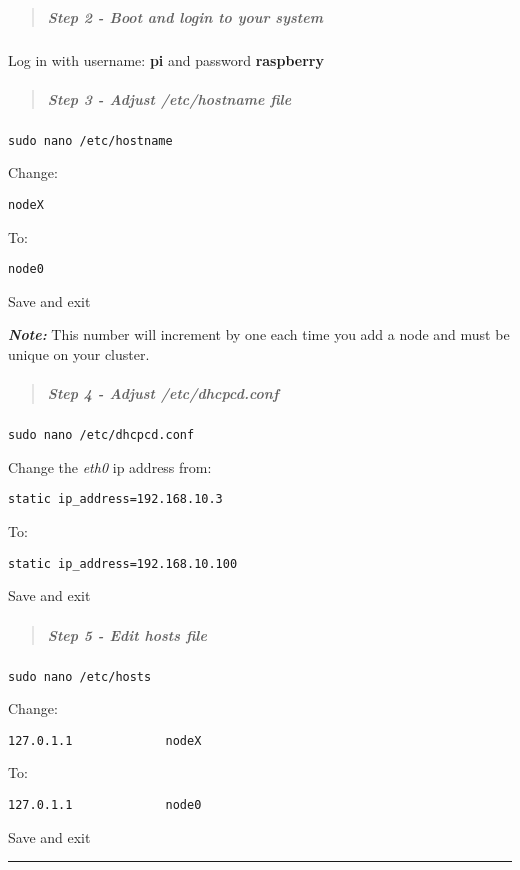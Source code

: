 \documentclass[]{article}
\let\oldsubparagraph\subparagraph
\renewcommand{\subparagraph}[1]{\oldsubparagraph{#1}\mbox{}}
\begin{document}
\begin{quote}
\mbox{}%
\subparagraph{Step 2 - Boot and login to your
system}\label{step-2---boot-and-login-to-your-system}
\end{quote}

Log in with username: \textbf{pi} and password \textbf{raspberry}

\begin{quote}
\mbox{}%
\subparagraph{\texorpdfstring{Step 3 - Adjust \emph{/etc/hostname}
file}{Step 3 - Adjust /etc/hostname file}}\label{step-3---adjust-etchostname-file}
\end{quote}

\texttt{sudo\ nano\ /etc/hostname}

Change:

\texttt{nodeX}

To:

\texttt{node0}

Save and exit

\emph{\textbf{Note:}} This number will increment by one each time you
add a node and must be unique on your cluster.

\begin{quote}
\mbox{}%
\subparagraph{\texorpdfstring{Step 4 - Adjust
\emph{/etc/dhcpcd.conf}}{Step 4 - Adjust /etc/dhcpcd.conf}}\label{step-4---adjust-etcdhcpcd.conf}
\end{quote}

\texttt{sudo\ nano\ /etc/dhcpcd.conf}

Change the \emph{eth0} ip address from:

\texttt{static\ ip\_address=192.168.10.3}

To:

\texttt{static\ ip\_address=192.168.10.100}

Save and exit

\begin{quote}
\mbox{}%
\subparagraph{Step 5 - Edit hosts file}\label{step-5---edit-hosts-file}
\end{quote}

\texttt{sudo\ nano\ /etc/hosts}

Change:

\texttt{127.0.1.1\ \ \ \ \ \ \ \ \ \ \ \ \ nodeX}

To:

\texttt{127.0.1.1\ \ \ \ \ \ \ \ \ \ \ \ \ node0}

Save and exit

\begin{center}\rule{0.5\linewidth}{\linethickness}\end{center}
\end{document}

